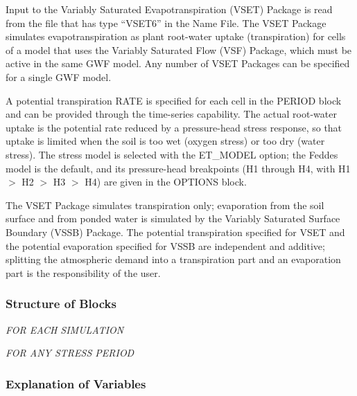 Input to the Variably Saturated Evapotranspiration (VSET) Package is read from the file that has type ``VSET6'' in the Name File.  The VSET Package simulates evapotranspiration as plant root-water uptake (transpiration) for cells of a model that uses the Variably Saturated Flow (VSF) Package, which must be active in the same GWF model.  Any number of VSET Packages can be specified for a single GWF model.

A potential transpiration RATE is specified for each cell in the PERIOD block and can be provided through the time-series capability.  The actual root-water uptake is the potential rate reduced by a pressure-head stress response, so that uptake is limited when the soil is too wet (oxygen stress) or too dry (water stress).  The stress model is selected with the ET\_MODEL option; the Feddes model is the default, and its pressure-head breakpoints (H1 through H4, with H1 $>$ H2 $>$ H3 $>$ H4) are given in the OPTIONS block.

The VSET Package simulates transpiration only; evaporation from the soil surface and from ponded water is simulated by the Variably Saturated Surface Boundary (VSSB) Package.  The potential transpiration specified for VSET and the potential evaporation specified for VSSB are independent and additive; splitting the atmospheric demand into a transpiration part and an evaporation part is the responsibility of the user.

\vspace{5mm}
\subsubsection{Structure of Blocks}
\vspace{5mm}

\noindent \textit{FOR EACH SIMULATION}



\vspace{5mm}
\noindent \textit{FOR ANY STRESS PERIOD}


\vspace{5mm}
\subsubsection{Explanation of Variables}
\begin{description}

\end{description}
